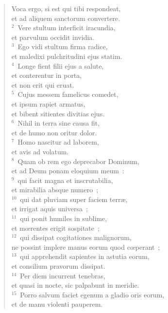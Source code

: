 \begin{flushleft}\begin{verse}\vspace{-19pt}Voca ergo, si est qui tibi respondeat,\\ et ad aliquem sanctorum convertere.\\
${}^{2}$~Vere stultum interficit iracundia,\\ et parvulum occidit invidia.\\
${}^{3}$~Ego vidi stultum firma radice,\\ et maledixi pulchritudini ejus statim.\\
${}^{4}$~Longe fient filii ejus a salute,\\ et conterentur in porta,\\ et non erit qui eruat.\\
${}^{5}$~Cujus messem famelicus comedet,\\ et ipsum rapiet armatus,\\ et bibent sitientes divitias ejus.\\
${}^{6}$~Nihil in terra sine causa fit,\\ et de humo non oritur dolor.\\
${}^{7}$~Homo nascitur ad laborem,\\ et avis ad volatum.\\
${}^{8}$~Quam ob rem ego deprecabor Dominum,\\ et ad Deum ponam eloquium meum~:\\
${}^{9}$~qui facit magna et inscrutabilia,\\ et mirabilia absque numero~;\\
${}^{10}$~qui dat pluviam super faciem terr\ae ,\\ et irrigat aquis universa~;\\
${}^{11}$~qui ponit humiles in sublime,\\ et mœrentes erigit sospitate~;\\
${}^{12}$~qui dissipat cogitationes malignorum,\\ ne possint implere manus eorum quod cœperant~;\\
${}^{13}$~qui apprehendit sapientes in astutia eorum,\\ et consilium pravorum dissipat.\\
${}^{14}$~Per diem incurrent tenebras,\\ et quasi in nocte, sic palpabunt in meridie.\\
${}^{15}$~Porro salvum faciet egenum a gladio oris eorum,\\ et de manu violenti pauperem.\\

\end{verse}
\end{flushleft}
